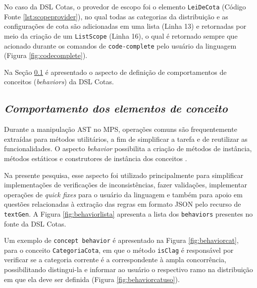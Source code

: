 No caso da DSL Cotas, o provedor de escopo foi o elemento \texttt{LeiDeCota} (Código Fonte \ref{lst:scopeprovider}), no qual todas as categorias da distribuição e as configurações de cota são adicionadas em uma lista (Linha 13) e retornadas por meio da criação de um \texttt{ListScope} (Linha 16), o qual é retornado sempre que acionado durante os comandos de \texttt{code-complete} pelo usuário da linguagem (Figura \ref{fig:codecomplete}).





Na Seção \ref{sub:sec:comportamentos} é apresentado o aspecto de definição de comportamentos de conceitos (\textit{behaviors}) da DSL Cotas.

\newpage
\subsection{\textit{Comportamento dos elementos de conceito}}
\label{sub:sec:comportamentos}

Durante a manipulação \gls{AST} no \gls{MPS}, operações comuns são frequentemente extraídas para métodos utilitários, a fim de simplificar a tarefa e de reutilizar as funcionalidades. O aspecto \textit{behavior} possibilita a criação de métodos de instância, métodos estáticos e construtores de instância dos conceitos \cite{jetbrains}.

Na presente pesquisa, esse aspecto foi utilizado principalmente para simplificar implementações de verificações de inconsistências, fazer validações, implementar operações de \textit{quick fixes} para o usuário da linguagem e também para apoio em questões relacionadas à extração das regras em formato JSON pelo recurso de \texttt{textGen}. A Figura \ref{fig:behaviorlista} apresenta a lista dos \texttt{behaviors} presentes no fonte da DSL Cotas.



Um exemplo de \texttt{concept behavior} é apresentado na Figura \ref{fig:behaviorcat}, para o conceito \texttt{CategoriaCota}, em que o método \texttt{isClag} é responsável por verificar se a categoria corrente é a correspondente à ampla concorrência, possibilitando distingui-la e informar ao usuário o respectivo ramo na distribuição em que ela deve ser definida (Figura \ref{fig:behaviorcatuso}).

